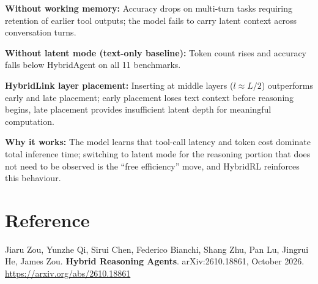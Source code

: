\documentclass[10pt,twocolumn]{article}
\begin{document}
\textbf{Without working memory:} Accuracy drops on multi-turn tasks
requiring retention of earlier tool outputs; the model fails to carry
latent context across conversation turns.

\textbf{Without latent mode (text-only baseline):} Token count rises and
accuracy falls below HybridAgent on all 11 benchmarks.

\textbf{HybridLink layer placement:} Inserting at middle layers
($l \approx L/2$) outperforms early and late placement; early placement
loses text context before reasoning begins, late placement provides
insufficient latent depth for meaningful computation.

\textbf{Why it works:} The model learns that tool-call latency and token
cost dominate total inference time; switching to latent mode for the
reasoning portion that does not need to be observed is the ``free
efficiency'' move, and HybridRL reinforces this behaviour.

\section*{Reference}

Jiaru Zou, Yunzhe Qi, Sirui Chen, Federico Bianchi, Shang Zhu, Pan Lu,
Jingrui He, James Zou.
\textbf{Hybrid Reasoning Agents}.
arXiv:2610.18861, October 2026.\\
\url{https://arxiv.org/abs/2610.18861}
\end{document}
